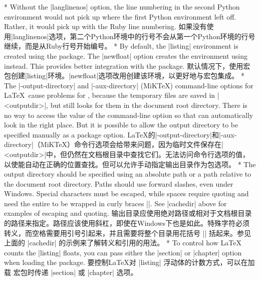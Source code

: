 \begin{paracol}{2}
\switchcolumn[0]*%
Without the |langlinenos| option, the line numbering in the second Python environment would not pick up where the first Python environment left off.  Rather, it would pick up with the Ruby line numbering.
\switchcolumn
如果没有使用|langlinenos|选项，第二个Python环境中的行号不会从第一个Python环境的行号继续，而是从Ruby行号开始编号。
\switchcolumn[0]*%
By default, the |listing| environment is created using the  package.  The |newfloat| option creates the environment using  instead.  This provides better integration with the  package.
\switchcolumn
{}
默认情况下，使用宏包创建|listing|环境。|newfloat|选项改用创建该环境，以更好地与宏包集成。
\switchcolumn[0]*%
The |-output-directory| and |-aux-directory| (MiKTeX) command-line options for \LaTeX\ cause problems for , because the  temporary files are saved in |<outputdir>|, but  still looks for them in the document root directory.  There is no way to access the value of the command-line option so that  can automatically look in the right place.  But it is possible to allow the output directory to be specified manually as a package option.
\switchcolumn
{}
\LaTeX 的|-output-directory|和|-aux-directory|（MiKTeX）命令行选项会给带来问题，因为临时文件保存在|<outputdir>|中，但仍然在文档根目录中查找它们。无法访问命令行选项的值，以使能自动在正确的位置查找。但可以允许手动指定输出目录作为包选项。
\switchcolumn[0]*%
The output directory should be specified using an absolute path or a path relative to the document root directory.  Paths should use forward slashes, even under Windows.  Special characters must be escaped, while spaces require quoting and need the entire  to be wrapped in curly braces |{}|.  See |cachedir| above for examples of escaping and quoting.
\switchcolumn
输出目录应使用绝对路径或相对于文档根目录的路径来指定。路径应该使用斜杠，即使在Windows下也是如此。特殊字符必须转义，而空格需要用引号引起来，并且需要将整个目录用花括号 |{}| 括起来。参见上面的 |cachedir| 的示例来了解转义和引用的用法。
\switchcolumn[0]*%
To control how \LaTeX{} counts the |listing| floats, you can pass either the
|section| or |chapter| option when loading the  package.
\switchcolumn
{}
要控制\LaTeX{}对 |listing| 浮动体的计数方式，可以在加载  宏包时传递 |section| 或 |chapter| 选项。
\end{paracol}
